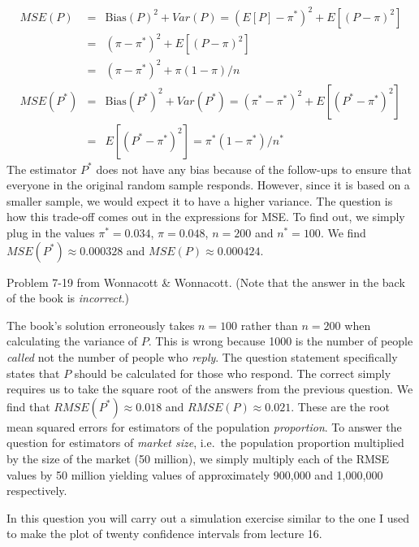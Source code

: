 \documentclass[addpoints,12pt]{exam}\usepackage[]{graphicx}\usepackage[]{color}
\begin{document}
\begin{questions}
\begin{solution}
	\begin{eqnarray*}
		MSE(P) &=& \mbox{Bias}(P)^2 + Var(P) = (E[P] - \pi^*)^2 + E[(P - \pi)^2]\\
		&=& (\pi - \pi^*)^2 + E[(P - \pi)^2]\\
		&=&  (\pi - \pi^*)^2 + \pi(1-\pi)/n\\
		MSE(P^*)	&=& \mbox{Bias}(P^*)^2 + Var(P^*) = (\pi^* - \pi^*)^2 + E[(P^* - \pi^*)^2]\\
			&=& E[(P^* - \pi^*)^2] = \pi^*(1-\pi^*)/n^*
	\end{eqnarray*}
The estimator $P^*$ does not have any bias because of the follow-ups to ensure that everyone in the original random sample responds. However, since it is based on a smaller sample, we would expect it to have a higher variance. The question is how this trade-off comes out in the expressions for MSE. To find out, we simply plug in the values $\pi^* = 0.034$, $\pi = 0.048$, $n =200$ and $n^* = 100$. We find $MSE(P^*) \approx 0.000328$ and $MSE(P) \approx 0.000424$.
    \end{solution}
    \question Problem 7-19 from Wonnacott \& Wonnacott. (Note that the answer in the back of the book is \emph{incorrect}.)
    \begin{solution}
The book's solution erroneously takes $n=100$ rather than $n = 200$ when calculating the variance of $P$. 
This is wrong because 1000 is the number of people \emph{called} not the number of people who \emph{reply}. 
The question statement specifically states that $P$ should be calculated for those who respond. 
The correct simply requires us to take the square root of the answers from the previous question. 
We find that $RMSE(P^*) \approx 0.018$ and $RMSE(P) \approx 0.021$. These are the root mean squared errors for estimators of the population \emph{proportion}. 
To answer the question for estimators of \emph{market size}, i.e.\ the population proportion multiplied by the size of the market (50 million), we simply multiply each of the RMSE values by 50 million yielding values of approximately 900,000 and 1,000,000 respectively.
    \end{solution}


  \question In this question you will carry out a simulation exercise similar to the one I used to make the plot of twenty confidence intervals from lecture 16.
    \begin{parts}

\end{parts}
\end{questions}
\end{document}
